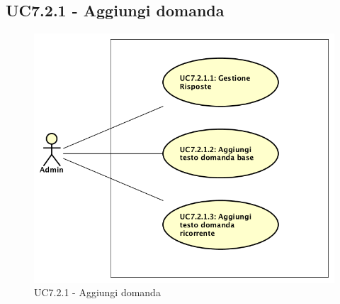 \documentclass[../AnalisiDeiRequisiti_v3.0.0.tex]{subfiles}
\begin{document}
\subsection{UC7.2.1 - Aggiungi domanda} 
\label{sssec:UC7.2.1} 
\begin{figure}[!h]
	\centering
	\includegraphics[scale=0.7]{UseCases/UC7_GestionePannelloAdmin/UC7_2_GestioneDomande/UC7_2_1_AggiungiDomanda/UC7_2_1_AggiungiDomanda.png}
	\caption{UC7.2.1 - Aggiungi domanda}
\end{figure}
\end{document}
